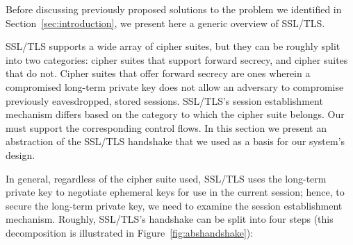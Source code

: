 \documentclass[../main.tex]{subfiles}
\begin{document}
\label{sec:ssloverview}
Before discussing previously proposed solutions to the problem we
identified in Section~\ref{sec:introduction}, we present here a
generic overview of SSL/TLS.

SSL/TLS supports a wide array of cipher suites, but they can be
roughly split into two categories: cipher suites that support forward
secrecy, and cipher suites that do not. Cipher suites that offer
forward secrecy are ones wherein a compromised long-term private key
does not allow an adversary to compromise previously eavesdropped,
stored sessions. SSL/TLS's session establishment mechanism differs
based on the category to which the cipher suite belongs. Our must
support the corresponding control flows. In this section we present an
abstraction of the SSL/TLS handshake that we used as a basis for our
system's design.

In general, regardless of the cipher suite used, SSL/TLS uses the
long-term private key to negotiate ephemeral keys for use in the
current session; hence, to secure the long-term private key, we need
to examine the session establishment mechanism. Roughly, SSL/TLS's
handshake can be split into four steps (this decomposition is
illustrated in Figure~\ref{fig:abshandshake}):
\end{document}
